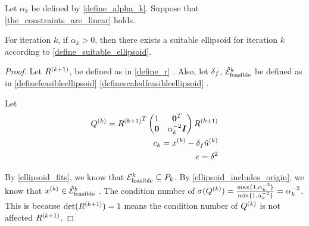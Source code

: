 

% 

% 

\begin{lemma}
\label{nontrivial_ellipsoid_exists}
Let $\alpha_k$ be defined by \cref{define_alpha_k}.
Suppose that \cref{the_constraints_are_linear} holds.

For iteration $k$, if $\alpha_k > 0$, then there exists a suitable ellipsoid for iteration $k$ according to \cref{define_suitable_ellipsoid}.
\end{lemma}

\begin{proof}
Let 
${R^{(k+1)}}$,
be defined as in
\cref{define_r}
.
Also, let
${\delta_{f}}$, ${{\mathcal {\hat E}_{\text{feasible}}}^k}$
be defined as in 
\cref{definefeasibleellipsoid}
\cref{definescaledfeasibleellipsoid}
.

Let
\begin{align*}
{Q^{(k)}} = {R^{(k+1)}}^T\begin{pmatrix}
1 & \boldsymbol0^T \\
\boldsymbol 0 & \alpha_k^{-2} \boldsymbol I \\
\end{pmatrix}{R^{(k+1)}} \\
c_k = x^{(k)} - {\delta_{f}} {{{\hat u}^{(k)}}} \\
\epsilon = \delta^2 
\end{align*}

By \cref{ellipsoid_fits}, we know that ${\mathcal E^k_{\textrm{feasible}}} \subseteq {P_k}$.
By \cref{ellipsoid_includes_origin}, we know that $x^{(k)} \in {{\mathcal {\hat E}_{\text{feasible}}}^k}$ .
The condition number of ${\sigma}({Q^{(k)}}) = \frac{\max\{1, \alpha_k^{-2}\}}{\min\{1, \alpha_k^{-2}\}} = \alpha_k^{-2}$.
This is because $\det({R^{(k+1)}}) = 1$ means the condition number of ${Q^{(k)}}$ is not affected ${R^{(k+1)}}$.
\end{proof}



